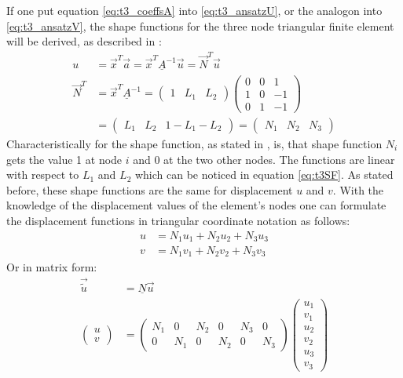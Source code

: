   If one put equation \ref{eq:t3_coeffsA} into \ref{eq:t3_ansatzU}, or the analogon into \ref{eq:t3_ansatzV}, the shape functions for the three node triangular finite element will be derived, as described in \cite{steinke2005finite}:
  \begin{align}\label{eq:t3SF}
  u &= \vec{x}^T \vec{a} = \vec{x}^T \underline{A}^{-1}\vec{u} = \vec{N}^T\vec{u} \nonumber\\
  \vec{N}^T &= \vec{x}^T \underline{A}^{-1} =
  \begin{pmatrix}
  1 & L_1 & L_2
  \end{pmatrix} \begin{pmatrix}
  0 & 0 & 1\\
  1 & 0 & -1\\
  0 & 1 & -1
  \end{pmatrix} \nonumber\\
  &= \begin{pmatrix}
  L_1 & L_2 & 1-L_1-L_2
  \end{pmatrix} = \begin{pmatrix}
  N_1 & N_2 & N_3
  \end{pmatrix}
  \end{align}
  Characteristically for the shape function, as stated in \cite{steinke2005finite}, is, that shape function $N_i$ gets the value 1 at node $i$ and 0 at the two other nodes. The functions are linear with respect to $L_1$ and $L_2$ which can be noticed in equation \ref{eq:t3SF}. As stated before, these shape functions are the same for displacement $u$ and $v$. With the knowledge of the displacement values of the element's nodes one can formulate the displacement functions in triangular coordinate notation as follows:
  \begin{align}
  u &= N_1 u_1 + N_2 u_2 + N_3 u_3 \nonumber\\
  v &= N_1 v_1 + N_2 v_2 + N_3 v_3
  \end{align}
  Or in matrix form:
  \begin{align} \label{eq:t3u=Nu}
  \vec{\tilde{u}} &= \underline{N} \vec{u} \nonumber\\
  \begin{pmatrix}
  u \\ v
  \end{pmatrix} &= \begin{pmatrix}
  N_1 & 0 & N_2 & 0 & N_3 & 0 \\
  0 & N_1 & 0 & N_2 & 0 & N_3
  \end{pmatrix} \begin{pmatrix}
  u_1 \\ v_1 \\ u_2 \\ v_2 \\ u_3 \\ v_3
  \end{pmatrix}
  \end{align}
